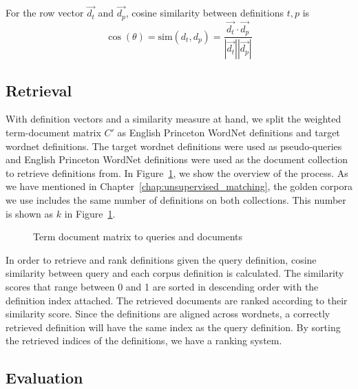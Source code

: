 For the row vector $\vec{d_t}$ and $\vec{d_p}$, cosine similarity between definitions $t, p$ is
\begin{equation}
    \cos(\theta) = \text{sim}(d_t, d_p) = \frac{\vec{d_t} \cdot \vec{d_p}}{|\vec{d_t}||\vec{d_p}|}
\end{equation}

\subsection{Retrieval}%
\label{sub:retrieval}

With definition vectors and a similarity measure at hand, we split the \tfidf{} weighted term-document matrix $C'$ as English Princeton WordNet definitions and target wordnet definitions.
The target wordnet definitions were used as pseudo-queries and English Princeton WordNet definitions were used as the document collection to retrieve definitions from.
In Figure~\ref{fig:term_document}, we show the overview of the process.
As we have mentioned in Chapter~\ref{chap:unsupervised_matching}, the golden corpora we use includes the same number of definitions on both collections.
This number is shown as $k$ in Figure~\ref{fig:term_document}.

\begin{figure}[htbp]
    \centering
    \caption{Term document matrix to queries and documents}%
    \label{fig:term_document}
\end{figure}

In order to retrieve and rank definitions given the query definition, cosine similarity between query and each corpus definition is calculated.
The similarity scores that range between 0 and 1 are sorted in descending order with the definition index attached.
The retrieved documents are ranked according to their similarity score.
Since the definitions are aligned across wordnets, a correctly retrieved definition will have the same index as the query definition.
By sorting the retrieved indices of the definitions, we have a ranking system.

\subsection{Evaluation}%
\label{sub:monolingual_evaluation}

